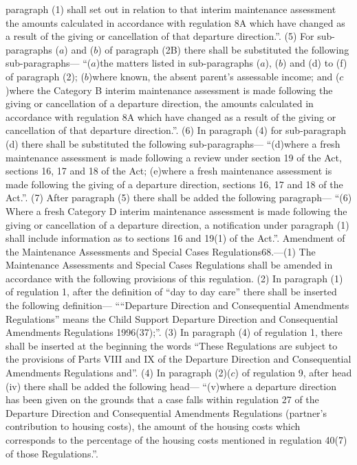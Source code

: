 \documentclass[a4paper]{article}
\begin{document}
paragraph (1) shall set out in relation to that interim maintenance assessment
the amounts calculated in accordance with regulation 8A which have changed as a
result of the giving or cancellation of that departure direction.”.
(5) For sub-paragraphs ($a$) and ($b$) of paragraph (2B) there shall be substituted
the following sub-paragraphs—
“($a$)the matters listed in sub-paragraphs ($a$), ($b$) and (d) to (f) of paragraph
(2);
($b$)where known, the absent parent’s assessable income; and
($c$)where the Category B interim maintenance assessment is made following the
giving or cancellation of a departure direction, the amounts calculated in
accordance with regulation 8A which have changed as a result of the giving or
cancellation of that departure direction.”.
(6) In paragraph (4) for sub-paragraph (d) there shall be substituted the
following sub-paragraphs—
“(d)where a fresh maintenance assessment is made following a review under
section 19 of the Act, sections 16, 17 and 18 of the Act;
(e)where a fresh maintenance assessment is made following the giving of a
departure direction, sections 16, 17 and 18 of the Act.”.
(7) After paragraph (5) there shall be added the following paragraph—
“(6) Where a fresh Category D interim maintenance assessment is made following
the giving or cancellation of a departure direction, a notification under
paragraph (1) shall include information as to sections 16 and 19(1) of the
Act.”.
Amendment of the Maintenance Assessments and Special Cases Regulations68.—(1)
The Maintenance Assessments and Special Cases Regulations shall be amended in
accordance with the following provisions of this regulation.
(2) In paragraph (1) of regulation 1, after the definition of “day to day care”
there shall be inserted the following definition—
““Departure Direction and Consequential Amendments Regulations” means the Child
Support Departure Direction and Consequential Amendments Regulations 1996(37);”.
(3) In paragraph (4) of regulation 1, there shall be inserted at the beginning
the words “These Regulations are subject to the provisions of Parts VIII and IX
of the Departure Direction and Consequential Amendments Regulations and”.
(4) In paragraph (2)($c$) of regulation 9, after head (iv) there shall be added
the following head—
“(v)where a departure direction has been given on the grounds that a case falls
within regulation 27 of the Departure Direction and Consequential Amendments
Regulations (partner’s contribution to housing costs), the amount of the housing
costs which corresponds to the percentage of the housing costs mentioned in
regulation 40(7) of those Regulations.”.
\end{document}
